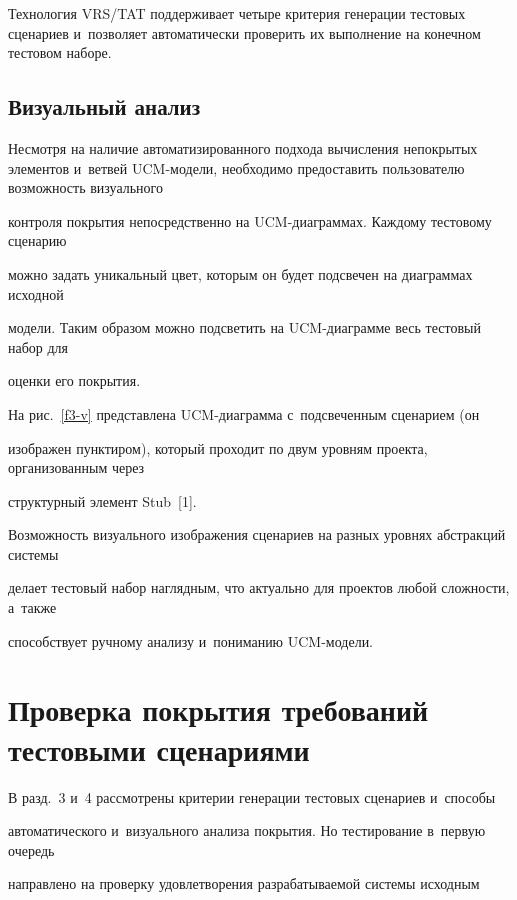   Технология VRS/TAT поддерживает четыре критерия генерации тестовых сценариев и~позволяет автоматически проверить их выполнение на конечном тестовом наборе.



\subsection{Визуальный анализ}



  Несмотря на наличие автоматизированного подхода вычисления непокрытых элементов и~ветвей UCM-мо\-де\-ли, необходимо предоставить пользователю возможность визуального

контроля покрытия непосредственно на UCM-диа\-грам\-мах. Каждому тестовому сценарию

можно задать уникальный цвет, которым он будет подсвечен на диаграммах исходной

модели. Таким образом можно подсветить на UCM-диа\-грам\-ме весь тестовый набор для

оценки его покрытия.



  На рис.~\ref{f3-v} представлена UCM-диаграмма с~подсвеченным сценарием (он

изображен пунктиром), который проходит по двум уровням проекта, организованным через

структурный элемент Stub~[1].



  Возможность визуального изображения сценариев на разных уровнях абстракций системы

делает тестовый набор наглядным, что актуально для проектов любой сложности, а~также

способствует ручному анализу и~пониманию UCM-мо\-дели.







\section{Проверка покрытия требований тестовыми сценариями}



  В разд.~3 и~4 рассмотрены критерии генерации тестовых сценариев и~способы

автоматического и~визуального анализа покрытия. Но тестирование в~первую очередь

направлено на проверку удовлетворения разрабатываемой системы исходным

